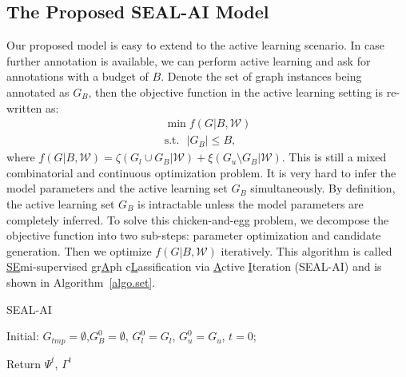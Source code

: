 \documentclass[sigconf]{acmart}
\begin{document}
\subsection{The Proposed SEAL-AI Model}\label{sec.ai}
Our proposed model is easy to extend to the active learning scenario.  In case further annotation is available, we can perform active learning and ask for annotations with a budget of $B$.  Denote the set of graph instances being annotated as $G_B$, then the objective function in the active learning setting is re-written as:
\begin{equation}
\begin{split}
  \min f(G|B, \mathcal{W})\\
  \text{s.t.}\ \ \ |G_B| \leq B,
\end{split}
\label{equ.ctotal}
\end{equation}
where $f(G|B, \mathcal{W}) = \zeta(G_l \cup G_B | \mathcal{W})+\xi(G_u \setminus G_B | \mathcal{W})$.  This is still a mixed combinatorial and continuous optimization problem.  It is very hard to infer the model parameters and the active learning set $G_B$ simultaneously.  By definition, the active learning set $G_B$ is intractable unless the model parameters are completely inferred.  To solve this chicken-and-egg problem, we decompose the objective function into two sub-steps: parameter optimization and candidate generation. Then we optimize $f(G|B, \mathcal{W})$ iteratively.  This algorithm is called \underline{SE}mi-supervised gr\underline{A}ph c\underline{L}assification via \underline{A}ctive \underline{I}teration (SEAL-AI) and is shown in Algorithm~\ref{algo.set}.



\begin{algorithm}[t]
  \caption{SEAL-AI}
  \label{algo.set}
Initial: $G_{tmp} =\emptyset$,$G_B^0 = \emptyset$, $G_l^0 = G_l$, $G_u^0 = G_u$, $t = 0$;

  Return $\Psi^t$, $\Gamma^t$\;
\end{algorithm}
\end{document}
